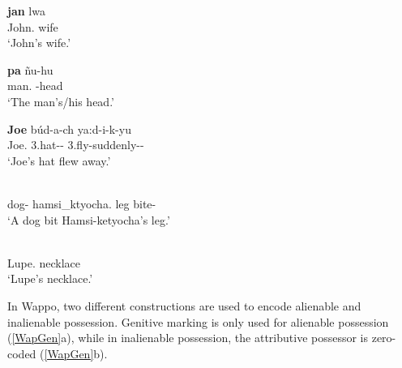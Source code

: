 
\begin{exe}\ex\label{HavGen}
\begin{xlist} 
\ex \gll \textbf{jan} lwa\\
John.\acc{} wife\\
\glt `John's wife.' %

\ex\gll \textbf{pa} \~nu-hu\\
man.\acc{} \dem{}-head\\
\glt `The man's/his head.' %
\end{xlist}
\end{exe}

\begin{exe}\ex\label{WalGen}
\gll \textbf{Joe} b\'ud-a-ch ya:d-i-k-yu\\
Joe.\acc{} 3.hat--\nom{} 3.fly-suddenly-\ssbj{}-\aux{}\\
\glt `Joe's hat flew away.'
\end{exe}

\begin{exe}\ex\label{YavGen}
\begin{xlist}\ex\gll\label{YavInal} \textbf{}  \\
dog-\nom{} hamsi\_ktyocha.\acc{} leg bite-\compl{}\\
\glt `A dog bit Hamsi-ketyocha's leg.'

\ex\gll\label{YavAlien}\textbf{} \\
Lupe.\acc{} necklace\\
\glt `Lupe's necklace.'
\end{xlist}
\end{exe}

In Wappo, two different constructions are used to encode alienable and inalienable possession.
Genitive marking is only used for alienable possession (\ref{WapGen}a), while in inalienable possession, the attributive possessor is zero-coded (\ref{WapGen}b).

